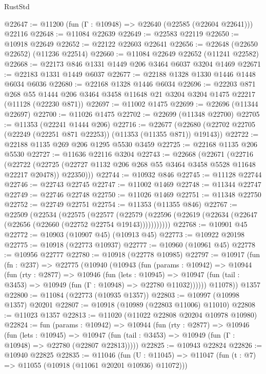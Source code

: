 \begin{lexlean}{RustStd}
\begin{coremodule}
{{{{{{{{{{{{{{{{{{{@22647 := @11200 (fun (Γ : @10948) => @22640 (@22585 (@22604 @22641))) @22116
@22648 := @11084 @22639
@22649 := @22583 @22119
@22650 := @10918 @22649
@22652 := @22122 @22603 @22641
@22656 := @22648 (@22650 @22652) (@11236 @22514)
@22660 := @11084 @22649 @22652 (@11241 @22582)
@22668 := @22173 @846 @1331 @1449 @206 @3464 @6037 @3204 @1469
@22671 := @22183 @1331 @1449 @6037
@22677 := @22188 @1328 @1330 @1446 @1448 @6034 @6036
@22680 := @22168 @1328 @1446 @6034
@22696 := @22203
    @871
    @268
    @55
    @1444
    @206
    @3464
    @3458
    @11648
    @21
    @3204
    @3204
    @1475
    @22217
    (@11128 (@22230 @871))
@22697 := @11002 @1475
@22699 := @22696 (@11344 @22697)
@22700 := @11026 @1475
@22702 := @22699 (@11348 @22700)
@22705 := @11353 (@22241 @1444 @206)
@22716 := @22677
    (@22680 (@22702 @22705 (@22249 (@22251 @871 @22253)) (@11353 (@11355 @871)) @19143))
@22722 := @22188 @1135 @269 @206 @1295 @5530 @3459
@22725 := @22168 @1135 @206 @5530
@22727 := @11636 @22116 @3204
@22743 := @22668
    (@22671
      (@22716
        (@22722
          (@22725 (@22727 @1132 @206 @268 @55 @3464 @3458 @5528 @11648 @22217 @20478))
          @22350)))
@22744 := @10932 @846
@22745 := @11128 @22744
@22746 := @22743 @22745
@22747 := @11002 @1469
@22748 := @11344 @22747
@22749 := @22746 @22748
@22750 := @11026 @1469
@22751 := @11348 @22750
@22752 := @22749 @22751
@22754 := @11353 (@11355 @846)
@22767 := @22509
    (@22534
      (@22575
        (@22577
          (@22579 (@22596 (@22619 (@22634 (@22647 (@22656 (@22660 (@22752 @22754 @19143)))))))))))
@22768 := @10901 @45
@22772 := @10903 (@10907 @45) (@10913 @45)
@22773 := @10922 @20198
@22775 := @10918 (@22773 @10937)
@22777 := @10960 (@10961 @45)
@22778 := @10956 @22777
@22780 := @10918 (@22778 @10985)
@22797 := @10917
    (fun (fn : @237) =>
    @22775
      (@10940
        (@10943
          (fun (params : @10942) =>
          @10944
            (fun (rty : @2877) =>
            @10946
              (fun (lets : @10945) =>
              @10947 (fun (tail : @3453) => @10949 (fun (Γ : @10948) => @22780 @11032))))))
        @11078))
    @1357
@22800 := @11084 (@22773 (@10935 @1357))
@22803 := @10997 (@10998 @1357) @20201
@22807 := @10918 (@10989 (@22803 @11006) @11010)
@22808 := @11023 @1357
@22813 := @11020 (@11022 @22808 @20204 @10978 @10980)
@22824 := fun (params : @10942) =>
  @10944
    (fun (rty : @2877) =>
    @10946
      (fun (lets : @10945) =>
      @10947 (fun (tail : @3453) => @10949 (fun (Γ : @10948) => @22780 (@22807 @22813)))))
@22825 := @10943 @22824
@22826 := @10940 @22825
@22835 := @11046
    (fun (U : @11045) => @11047 (fun (t : @7) => @11055 (@10918 (@11061 @20201 @10936) @11072)))
}}}}}}}}}}}}}}}}}}}
\end{coremodule}
\end{lexlean}
